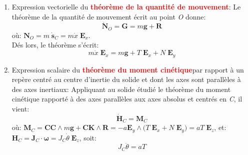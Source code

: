 \documentclass[a4paper]{article}
\begin{document}
\begin{enumerate}





\item Expression vectorielle du \textcolor{red}{\textbf{théorème de la quantité de mouvement}}\footnotemark[\value{footnote}]: Le théorème de la quantité de mouvement écrit au point \emph{O} donne:
\[ \dot{\textbf{N}}_O = \textbf{G} = m \textbf{g} + \textbf{R} \]
où: $\displaystyle \textbf{N}_O = m \; \dot{\textbf{s}}_C = m \dot{x} \; \textbf{E}_x $. \\
Dés lors, le théorème s'écrit: 
\begin{equation}\tag{Th.1}
m \ddot{x} \; \textbf{E}_x = m \textbf{g} + T \; \textbf{E}_x + N \; \textbf{E}_y 
\end{equation}





\item Expression scalaire du \textcolor{red}{\textbf{théorème du moment cinétique}}\footnotemark[\value{footnote}] par rapport à un repère centré au centre d’inertie du solide et dont les axes sont parallèles à des axes inertiaux: Appliquant au solide étudié le théorème du moment cinétique rapporté à des axes parallèles aux axes absolus et centrés en \emph{C}, il vient:
\[ \dot{\textbf{H}}_C = \textbf{M}_C \]
où: $\displaystyle \textbf{M}_C = \textbf{CC} \wedge m \textbf{g} + \textbf{CK} \wedge \textbf{R} = - a \textbf{E}_y \wedge \big( T \; \textbf{E}_x + N \; \textbf{E}_y \big) = a T \; \textbf{E}_z $, et: $\displaystyle \textbf{H}_C = \textbf{J}_C \cdot \boldsymbol{\omega} = J_C \dot{\theta} \; \textbf{E}_z $, soit:
\begin{equation}\tag{Th.2}
J_C \ddot{\theta} = a T
\end{equation}






\end{enumerate}
\end{document}
